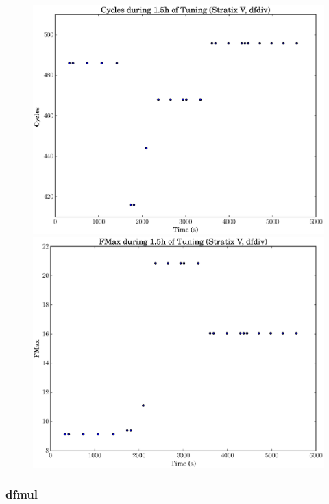 \documentclass[12pt, a4paper]{article}
\begin{document}
\begin{figure}[htpb]
    \begin{minipage}{.48\textwidth}
        \includegraphics[scale=.25]{dfdiv_cycles_5400_chstone_StratixV}
    \end{minipage}%
    \hfill
    \begin{minipage}{.48\textwidth}
        \includegraphics[scale=.25]{dfdiv_fmax_5400_chstone_StratixV}
    \end{minipage}%
\end{figure}

\newpage

\subsubsection{dfmul}
\end{document}
